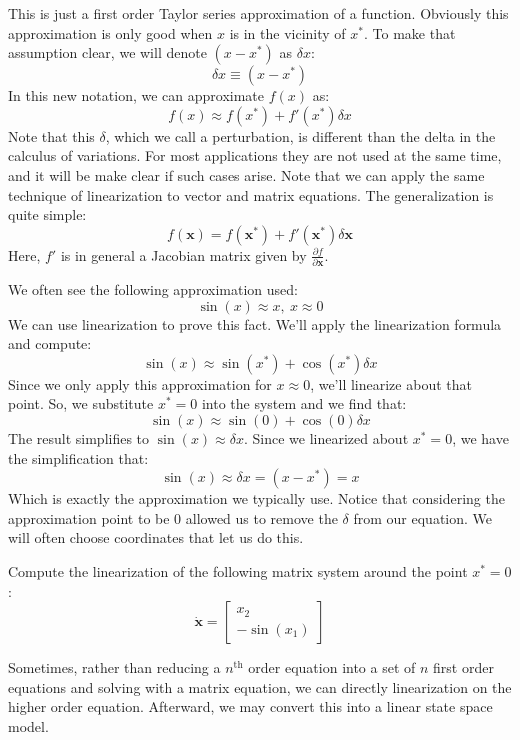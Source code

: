 This is just a first order Taylor series approximation of a function. Obviously this approximation is only good when $x$ is in the vicinity of $x^*$. To make that assumption clear, we will denote $(x-x^*)$ as $\delta x$:
$$\delta x\equiv(x-x^*)$$
In this new notation, we can approximate $f(x)$ as:
$$f(x)\approx f(x^*)+f'(x^*)\delta x$$
Note that this $\delta$, which we call a perturbation, is different than the delta in the calculus of variations. For most applications they are not used at the same time, and it will be make clear if such cases arise. Note that we can apply the same technique of linearization to vector and matrix equations. The generalization is quite simple:
$$f(\bm{x})=f(\bm{x^*})+f'(\bm{x^*})\delta \bm{x}$$
Here, $f'$ is in general a Jacobian matrix given by $\frac{\partial f}{\partial \bm{x}}$.
\begin{example}
We often see the following approximation used:
$$\sin(x)\approx x,\ x\approx0$$
We can use linearization to prove this fact. We'll apply the linearization formula and compute:
$$\sin(x)\approx\sin(x^*)+\cos(x^*)\delta x$$
Since we only apply this approximation for $x\approx0$, we'll linearize about that point. So, we substitute $x^*=0$ into the system and we find that:
$$\sin(x)\approx \sin(0)+\cos(0)\delta x$$
The result simplifies to $\sin(x)\approx \delta x$. Since we linearized about $x^*=0$, we have the simplification that:
$$\sin(x)\approx \delta x=(x-x^*)=x$$
Which is exactly the approximation we typically use. Notice that considering the approximation point to be 0 allowed us to remove the $\delta$ from our equation. We will often choose coordinates that let us do this.
\end{example}
\begin{exercise}\label{exer:matrix_linearization}
Compute the linearization of the following matrix system around the point $x^*=0$:
$$\bm{\dot{x}}=\begin{bmatrix}
x_2\\
-\sin(x_1)
\end{bmatrix}$$
\end{exercise}

Sometimes, rather than reducing a $n^\text{th}$ order equation into a set of $n$ first order equations and solving with a matrix equation, we can directly linearization on the higher order equation. Afterward, we may convert this into a linear state space model.


